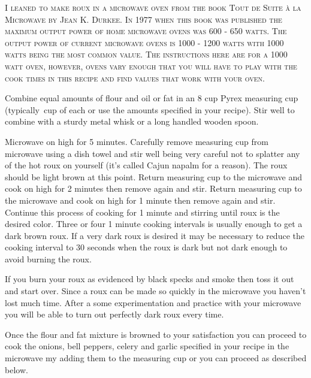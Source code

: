 \documentclass[letterpaper]{recipePMG}
\newcommand{\twothirds}{\nicefrac{2}{3} \,}
\begin{document}
\newpage

\label{BrownRoux}


\textsc{I leaned to make roux in a microwave oven from the book Tout de Suite \`{a} la Microwave by Jean K. Durkee. In 1977 when this book was published the maximum output power of home microwave ovens was 600 - 650 watts. The output power of current microwave ovens is 1000 - 1200 watts with 1000 watts being the most common value. The instructions here are for a 1000 watt oven, however, ovens vary enough that you will have to play with the cook times in this recipe and find values that work with your oven.}

Combine equal amounts  of flour and oil or fat in an 8 cup Pyrex measuring cup (typically \twothirds cup of each or use the amounts specified in your recipe). Stir well to combine with a sturdy metal whisk or a long handled wooden spoon.

Microwave on high for 5 minutes.  Carefully remove measuring cup from microwave using a dish towel and stir well being very careful not to splatter any of the hot roux on yourself (it's called Cajun napalm for a reason). The roux should be light brown at this point. Return measuring cup to the microwave and cook on high for 2 minutes then remove again and stir. Return measuring cup to the microwave and cook on high for 1 minute then remove again and stir. Continue this process of cooking for 1 minute and stirring until roux is the desired color. Three or four 1 minute cooking intervals is usually enough to get a dark brown roux. If a very dark roux is desired it may be necessary to reduce the cooking interval to 30 seconds when the roux is dark but not dark enough to avoid burning the roux. 

If you burn your roux as evidenced by black specks and smoke then toss it out and start over.  Since a roux can be made so quickly in the microwave you haven't lost much time.  After a some experimentation and practice with your microwave you will be able to turn out perfectly dark roux every time.

Once the flour and fat mixture is browned to your satisfaction you can proceed to cook the onions, bell peppers, celery and garlic specified in your recipe in the microwave my adding them to the measuring cup or you can proceed as described below.
\end{document}
